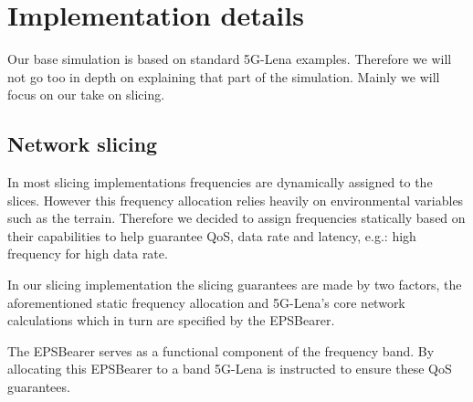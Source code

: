 \section{Implementation details}
    Our base simulation is based on standard 5G-Lena examples. Therefore we will not go too in depth on explaining that part of the simulation.
    Mainly we will focus on our take on slicing.
    
    \subsection{Network slicing}
    In most slicing implementations frequencies are dynamically assigned to the slices. However this frequency allocation relies heavily on environmental variables such as the terrain. Therefore we decided to assign frequencies statically based on their capabilities to help guarantee QoS, data rate and latency, e.g.: high frequency for high data rate.
    
    In our slicing implementation the slicing guarantees are made by two factors, the aforementioned static frequency allocation and 5G-Lena's core network calculations which in turn are specified by the EPSBearer. 
    
    The EPSBearer serves as a functional component of the frequency band. By allocating this EPSBearer to a band 5G-Lena is instructed to ensure these QoS guarantees.
    
